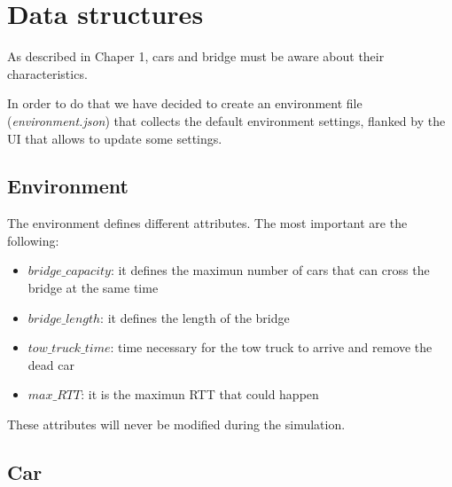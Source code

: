 \section{Data structures}

As described in Chaper 1, cars and bridge must be aware about their characteristics.

In order to do that we have decided to create an environment file 
(\textit{environment.json}) that collects the default environment settings,
flanked by the UI that allows to update some settings.   


\subsection{Environment}

The environment defines different attributes. The most important are the following:
\begin{itemize}
    \item $bridge\_capacity$: it defines the maximun number of cars that can cross the bridge
    at the same time
    \item $bridge\_length$: it defines the length of the bridge
    \item $tow\_truck\_time$: time necessary for the tow truck to arrive and remove the dead car
    \item $max\_RTT$: it is the maximun RTT that could happen
\end{itemize}

These attributes will never be modified during the simulation.

\subsection{Car}

